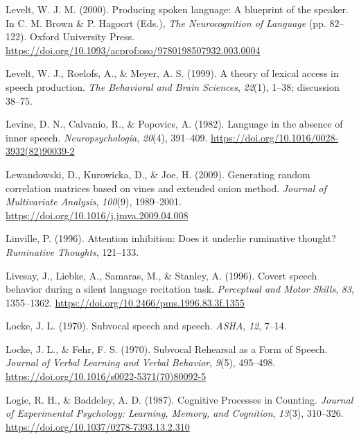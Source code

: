 \documentclass[a4paper,12pt,twoside,openright,oldfontcommands]{memoir}
\begin{document}
\leavevmode\hypertarget{ref-brown_producing_2000}{}%
Levelt, W. J. M. (2000). Producing spoken language: A blueprint of the speaker. In C. M. Brown \& P. Hagoort (Eds.), \emph{The Neurocognition of Language} (pp. 82--122). Oxford University Press. \url{https://doi.org/10.1093/acprof:oso/9780198507932.003.0004}

\leavevmode\hypertarget{ref-levelt_theory_1999}{}%
Levelt, W. J., Roelofs, A., \& Meyer, A. S. (1999). A theory of lexical access in speech production. \emph{The Behavioral and Brain Sciences}, \emph{22}(1), 1--38; discussion 38--75.

\leavevmode\hypertarget{ref-levine_language_1982}{}%
Levine, D. N., Calvanio, R., \& Popovics, A. (1982). Language in the absence of inner speech. \emph{Neuropsychologia}, \emph{20}(4), 391--409. \url{https://doi.org/10.1016/0028-3932(82)90039-2}

\leavevmode\hypertarget{ref-lewandowski_generating_2009}{}%
Lewandowski, D., Kurowicka, D., \& Joe, H. (2009). Generating random correlation matrices based on vines and extended onion method. \emph{Journal of Multivariate Analysis}, \emph{100}(9), 1989--2001. \url{https://doi.org/10.1016/j.jmva.2009.04.008}

\leavevmode\hypertarget{ref-linville_attention_1996}{}%
Linville, P. (1996). Attention inhibition: Does it underlie ruminative thought? \emph{Ruminative Thoughts}, 121--133.

\leavevmode\hypertarget{ref-livesay_covert_1996}{}%
Livesay, J., Liebke, A., Samaras, M., \& Stanley, A. (1996). Covert speech behavior during a silent language recitation task. \emph{Perceptual and Motor Skills}, \emph{83}, 1355--1362. \url{https://doi.org/10.2466/pms.1996.83.3f.1355}

\leavevmode\hypertarget{ref-locke_subvocal_1970-1}{}%
Locke, J. L. (1970). Subvocal speech and speech. \emph{ASHA}, \emph{12}, 7--14.

\leavevmode\hypertarget{ref-locke_subvocal_1970}{}%
Locke, J. L., \& Fehr, F. S. (1970). Subvocal Rehearsal as a Form of Speech. \emph{Journal of Verbal Learning and Verbal Behavior}, \emph{9}(5), 495--498. \url{https://doi.org/10.1016/s0022-5371(70)80092-5}

\leavevmode\hypertarget{ref-logie_cognitive_1987}{}%
Logie, R. H., \& Baddeley, A. D. (1987). Cognitive Processes in Counting. \emph{Journal of Experimental Psychology: Learning, Memory, and Cognition}, \emph{13}(3), 310--326. \url{https://doi.org/10.1037/0278-7393.13.2.310}
\end{document}
